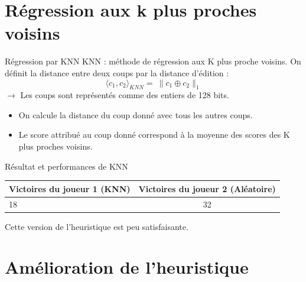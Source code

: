 \documentclass{beamer}
\begin{document}
{\section{Régression aux k plus proches voisins}}

\begin{frame}{Régression par KNN}
    KNN : méthode de régression aux \alert{K plus proche voisins}.
    On définit la distance entre deux coups par la \alert{distance d'édition} :
    $$ \langle c_1, c_2 \rangle_{KNN} = \ \rVert c_1 \oplus c_2 \lVert_1 $$
    $\rightarrow$ Les coups sont représentés comme des entiers de 128 bits.
    \begin{itemize}
        \item On calcule la distance du coup donné avec tous les autres coups.
        \item Le score attribué au coup donné correspond à \alert{la moyenne des scores} des K plus proches voisins.
    \end{itemize}
\end{frame}

\begin{frame}{Résultat et performances de KNN}
    \begin{center}
        \begin{tabular}{ | l | c | }
            \hline
            Victoires du joueur 1 (KNN) & Victoires du joueur 2 (Aléatoire) \\ \hline
            18                          & 32                                \\ \hline
        \end{tabular}
    \end{center}
    Cette version de l'heuristique est peu satisfaisante.
\end{frame}

{\section{Amélioration de l'heuristique}}
\end{document}
